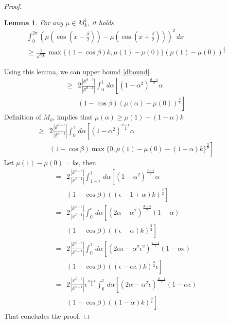 \documentclass[twoside]{article} \usepackage{aistats2017}
\newtheorem{lemma}[theorem]{Lemma}
\begin{document}
\begin{proof}
\begin{lemma}
        For any $\mu\in M_k^1$, it holds
        \begin{align*}
            \int_{0}^{2\pi}\left(\mu(\cos(x-\frac{\beta}{2}))-\mu( \cos(x+\frac{\beta}{2}))\right)^2\, dx\\
            \geq \frac{1}{\sqrt{2k}}\max\{(1-\cos{\beta})k,\mu(1)-\mu(0)\}(\mu(1)-\mu(0))^\frac{3}{2}
        \end{align*}
    \end{lemma}
    Using this lemma, we can upper bound \eqref{dbound} 
    \begin{align*}
        \geq&2\frac{|\mathcal{S}^{d-3}|}{|\mathcal{S}^{d-1}|}\int_{0}^{1}\,d\alpha\left[(1-\alpha^2)^{\frac{d-4}{2}}\alpha\right.\\
    &\left.(1-\cos{\beta})(\mu(\alpha)-\mu(0))^\frac{3}{2}\right]
    \end{align*}
    Definition of $M_k$, implies that $\mu(\alpha)\geq \mu(1)-(1-\alpha)k$
    \begin{align*}
        \geq&2\frac{|\mathcal{S}^{d-3}|}{|\mathcal{S}^{d-1}|}\int_{0}^{1}\,d\alpha\left[(1-\alpha^2)^{\frac{d-4}{2}}\alpha\right.\\
    &\left.(1-\cos{\beta})\max\{0,\mu(1)-\mu(0)-(1-\alpha)k\}^\frac{3}{2}\right]
    \end{align*}
Let $\mu(1)-\mu(0) =k\epsilon$, then
    \begin{align*}
        =&2\frac{|\mathcal{S}^{d-3}|}{|\mathcal{S}^{d-1}|}\int_{1-\epsilon}^{1}\,d\alpha\left[(1-\alpha^2)^{\frac{d-4}{2}}\alpha\right.\\
    &\left.(1-\cos{\beta})((\epsilon-1+\alpha)k)^\frac{3}{2}\right]\\
        =&2\frac{|\mathcal{S}^{d-3}|}{|\mathcal{S}^{d-1}|}\int_{0}^{\epsilon}\,d\alpha\left[(2\alpha-\alpha^2)^{\frac{d-4}{2}}(1-\alpha)\right.\\
    &\left.(1-\cos{\beta})((\epsilon-\alpha)k)^\frac{3}{2}\right]\\
    =&2\frac{|\mathcal{S}^{d-3}|}{|\mathcal{S}^{d-1}|}\int_{0}^{1}\,d\alpha\left[(2\alpha\epsilon-\alpha^2\epsilon^2)^{\frac{d-4}{2}}(1-\alpha\epsilon)\right.\\
    &\left.(1-\cos{\beta})((\epsilon-\alpha\epsilon)k)^\frac{3}{2}\epsilon\right]\\
    =&2\frac{|\mathcal{S}^{d-3}|}{|\mathcal{S}^{d-1}|}\epsilon^{\frac{d+1}{2}}\int_{0}^{1}\,d\alpha\left[(2\alpha-\alpha^2\epsilon)^{\frac{d-4}{2}}(1-\alpha\epsilon)\right.\\
    &\left.(1-\cos{\beta})((1-\alpha)k)^\frac{3}{2}\right]
    \end{align*}
    That concludes the proof.
\end{proof}
\end{document}
